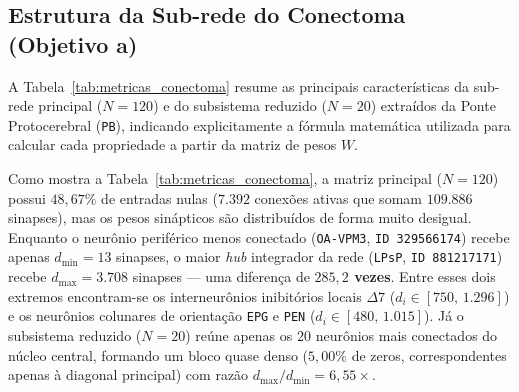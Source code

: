 \documentclass[12pt,a4paper]{article}
\begin{document}
\subsection{Estrutura da Sub-rede do Conectoma (Objetivo a)}

A Tabela~\ref{tab:metricas_conectoma} resume as principais características da sub-rede principal ($N = 120$) e do subsistema reduzido ($N = 20$) extraídos da Ponte Protocerebral (\texttt{PB}), indicando explicitamente a fórmula matemática utilizada para calcular cada propriedade a partir da matriz de pesos $W$.

\begin{table}[H]
\centering
\caption{Métricas estruturais e de conectividade das sub-redes extraídas da região \texttt{PB} (\texttt{hemibrain:v1.2.1}) e respectivas expressões de cálculo.}
\label{tab:metricas_conectoma}
\small
{}
\end{table}

Como mostra a Tabela~\ref{tab:metricas_conectoma}, a matriz principal ($N = 120$) possui $48{,}67\%$ de entradas nulas ($7.392$ conexões ativas que somam $109.886$ sinapses), mas os pesos sinápticos são distribuídos de forma muito desigual. Enquanto o neurônio periférico menos conectado (\texttt{OA-VPM3}, \texttt{ID 329566174}) recebe apenas $d_{\min} = 13$ sinapses, o maior \textit{hub} integrador da rede (\texttt{LPsP}, \texttt{ID 881217171}) recebe $d_{\max} = 3.708$ sinapses --- uma diferença de \textbf{$285{,}2$ vezes}. Entre esses dois extremos encontram-se os interneurônios inibitórios locais $\Delta 7$ ($d_i \in [750,\, 1.296]$) e os neurônios colunares de orientação \texttt{EPG} e \texttt{PEN} ($d_i \in [480,\, 1.015]$). Já o subsistema reduzido ($N = 20$) reúne apenas os $20$ neurônios mais conectados do núcleo central, formando um bloco quase denso ($5{,}00\%$ de zeros, correspondentes apenas à diagonal principal) com razão $d_{\max}/d_{\min} = 6{,}55\times$.
\end{document}

